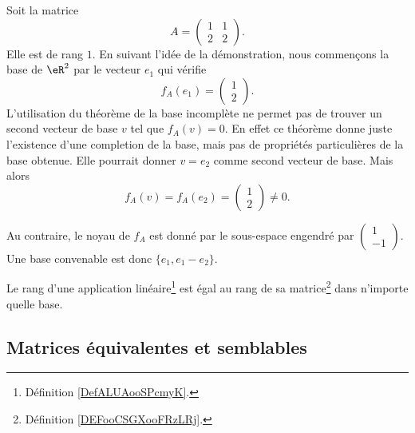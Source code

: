 \begin{example}     \label{EXooRKVQooZOGDEf}
	Soit la matrice
	\begin{equation}
		A=\begin{pmatrix}
			1 & 1 \\
			2 & 2
		\end{pmatrix}.
	\end{equation}
	Elle est de rang \( 1\). En suivant l'idée de la démonstration, nous commençons la base de \( \eR^2\) par le vecteur \( e_1\) qui vérifie
	\begin{equation}
		f_A(e_1)=\begin{pmatrix}
			1 \\
			2
		\end{pmatrix}.
	\end{equation}
	L'utilisation du théorème de la base incomplète ne permet pas de trouver un second vecteur de base \( v\) tel que \( f_A(v)=0\). En effet ce théorème donne juste l'existence d'une completion de la base, mais pas de propriétés particulières de la base obtenue. Elle pourrait donner \( v=e_2\) comme second vecteur de base. Mais alors
	\begin{equation}
		f_A(v)=f_A(e_2)=\begin{pmatrix}
			1 \\
			2
		\end{pmatrix}\neq 0.
	\end{equation}

	Au contraire, le noyau de \( f_A\) est donné par le sous-espace engendré par \( \begin{pmatrix}
		1 \\
		-1
	\end{pmatrix}\). Une base convenable est donc \( \{ e_1, e_1-e_2 \}\).
\end{example}

\begin{proposition}     \label{PROPooEGNBooIffJXc}
	Le rang d'une application linéaire\footnote{Définition \ref{DefALUAooSPcmyK}.} est égal au rang de sa matrice\footnote{Définition \ref{DEFooCSGXooFRzLRj}.} dans n'importe quelle base.
\end{proposition}

\subsection{Matrices équivalentes et semblables}


